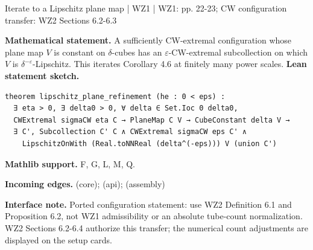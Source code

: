 \documentclass[10pt,a4paper]{article}
\newcommand{\nodecard}[1]{\hyperlink{node-#1}{\texttt{\detokenize{#1}}}}
\begin{document}
\begin{minipage}{\linewidth}
\hypertarget{node-L4_7}{}
\begin{tcolorbox}[colback=white,colframe=planefg,colbacktitle=planebg,coltitle=ink,boxrule=0.45pt,arc=1.6mm,left=3mm,right=3mm,top=2mm,bottom=2mm,title={\sffamily\bfseries WZ1 Lemma 4.7 / CW \hfill \texttt{L4\_7}}]
{\sffamily\small\color{muted}Iterate to a Lipschitz plane map | WZ1 | WZ1: pp. 22-23; CW configuration transfer: WZ2 Sections 6.2-6.3}\par
\textbf{Mathematical statement.} A sufficiently CW-extremal configuration whose plane map $V$ is constant on $\delta$-cubes has an $\varepsilon$-CW-extremal subcollection on which $V$ is $\delta^{-\varepsilon}$-Lipschitz.
This iterates Corollary 4.6 at finitely many power scales.
\smallskip\textbf{Lean statement sketch.}
\begin{Verbatim}[fontsize=\small,breaklines=true,breakanywhere=true,tabsize=2]
theorem lipschitz_plane_refinement (he : 0 < eps) :
  ∃ eta > 0, ∃ delta0 > 0, ∀ delta ∈ Set.Ioc 0 delta0,
  CWExtremal sigmaCW eta C → PlaneMap C V → CubeConstant delta V →
  ∃ C', Subcollection C' C ∧ CWExtremal sigmaCW eps C' ∧
    LipschitzOnWith (Real.toNNReal (delta^(-eps))) V (union C')
\end{Verbatim}
{\footnotesize\textbf{Mathlib support.} F, G, L, M, Q.\par
\textbf{Incoming edges.} \nodecard{C4_6} (core); \nodecard{Iparams} (api); \nodecard{L4_4} (assembly)\par}
{\footnotesize\textbf{Interface note.}  Ported configuration statement: use WZ2 Definition 6.1 and Proposition 6.2, not WZ1 admissibility or an absolute tube-count normalization. WZ2 Sections 6.2-6.4 authorize this transfer; the numerical count adjustments are displayed on the setup cards.}
\end{tcolorbox}\end{minipage}\par\medskip
\end{document}
